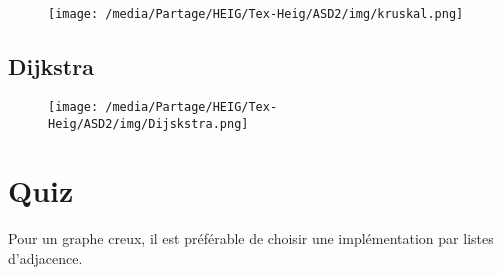 \documentclass[
]{article}
\begin{document}
\begin{figure}
\centering
\texttt{[image: /media/Partage/HEIG/Tex-Heig/ASD2/img/kruskal.png]}
\caption{}
\end{figure}

\hypertarget{header-n116}{%
\subsection{Dijkstra}\label{header-n116}}

\begin{figure}
\centering
\texttt{[image: /media/Partage/HEIG/Tex-Heig/ASD2/img/Dijskstra.png]}
\caption{}
\end{figure}

\hypertarget{header-n126}{%
\section{Quiz}\label{header-n126}}

Pour un graphe creux, il est préférable de choisir une implémentation
par listes d'adjacence.
\end{document}
